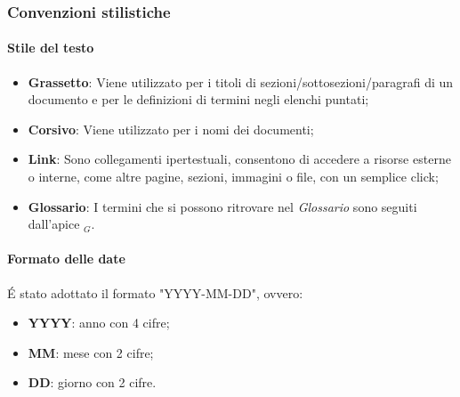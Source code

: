 \documentclass[10pt]{article}
\begin{document}
\begin{justify}
    \subsubsection{Convenzioni stilistiche}
        \paragraph{Stile del testo}
        \begin{itemize}
            \item \textbf{Grassetto}: Viene utilizzato per i titoli di sezioni/sottosezioni/paragrafi di un documento e per le definizioni di termini negli elenchi puntati;
            \item \textbf{Corsivo}: Viene utilizzato per i nomi dei documenti;
            \item \textbf{Link}: Sono collegamenti ipertestuali, consentono di accedere a risorse esterne o interne, come altre pagine, sezioni, immagini o file, con un semplice click;
            \item \textbf{Glossario}: I termini che si possono ritrovare nel \textit{Glossario} sono seguiti dall'apice $_G$.
        \end{itemize}

        \paragraph{Formato delle date}
        \'E stato adottato il formato "YYYY-MM-DD", ovvero:
        \begin{itemize}
            \item \textbf{YYYY}: anno con 4 cifre;
            \item \textbf{MM}: mese con 2 cifre;
            \item \textbf{DD}: giorno con 2 cifre.
        \end{itemize}


\end{justify}
\end{document}
